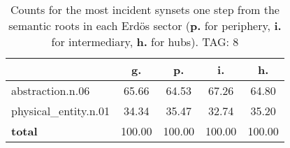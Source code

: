 \begin{table}[h!]
\begin{center}
\begin{tabular}{| l | c | c | c | c |}\hline
 & g. & p. & i. & h. \\\hline
abstraction.n.06 & 65.66  & 64.53  & 67.26  & 64.80 \\\hline
physical\_entity.n.01 & 34.34  & 35.47  & 32.74  & 35.20 \\\hline
{{\bf total}} & 100.00  & 100.00  & 100.00  & 100.00 \\\hline
\end{tabular}
\caption{Counts for the most incident synsets one step from the semantic roots in each Erd\"os sector ({\bf p.} for periphery, {\bf i.} for intermediary, {\bf h.} for hubs). TAG: 8}
\end{center}
\end{table}